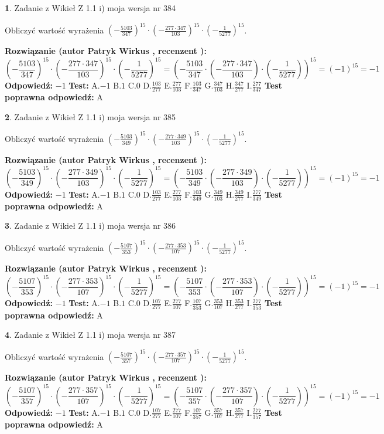 \documentclass[12pt, a4paper]{article}
\theoremstyle{definition} %
\newtheorem{zad}{}
\newcommand{\zadStart}[1]{\begin{zad}#1\newline}
\newcommand{\zadStop}{\end{zad}}
\newcommand{\rozwStart}[2]{\noindent \textbf{Rozwiązanie (autor #1 , recenzent #2): }\newline}
\newcommand{\rozwStop}{\newline}
\newcommand{\odpStart}{\noindent \textbf{Odpowiedź:}\newline}
\newcommand{\odpStop}{\newline}
\newcommand{\testStart}{\noindent \textbf{Test:}\newline}
\newcommand{\testStop}{\newline}
\newcommand{\kluczStart}{\noindent \textbf{Test poprawna odpowiedź:}\newline}
\newcommand{\kluczStop}{\newline}
\begin{document}
\zadStart{Zadanie z Wikieł Z 1.1 i) moja wersja nr 384}

Obliczyć wartość wyrażenia $(-\frac{5103}{347})^{15} \cdot (-\frac{277 \cdot 347}{103})^{15} \cdot (-\frac{1}{5277})^{15}$.
\zadStop
\rozwStart{Patryk Wirkus}{}
$$(-\frac{5103}{347})^{15} \cdot (-\frac{277 \cdot 347}{103})^{15} \cdot (-\frac{1}{5277})^{15} = (-\frac{5103}{347} \cdot (-\frac{277 \cdot 347}{103}) \cdot (-\frac{1}{5277}))^{15} = (-1)^{15} = -1$$
\rozwStop
\odpStart
$-1$
\odpStop
\testStart
A.$-1$ B.$1$ C.$0$ D.$\frac{103}{277}$ E.$\frac{277}{103}$
F.$\frac{103}{347}$ G.$\frac{347}{103}$
H.$\frac{347}{277}$
I.$\frac{277}{347}$
\testStop
\kluczStart
A
\kluczStop



\zadStart{Zadanie z Wikieł Z 1.1 i) moja wersja nr 385}

Obliczyć wartość wyrażenia $(-\frac{5103}{349})^{15} \cdot (-\frac{277 \cdot 349}{103})^{15} \cdot (-\frac{1}{5277})^{15}$.
\zadStop
\rozwStart{Patryk Wirkus}{}
$$(-\frac{5103}{349})^{15} \cdot (-\frac{277 \cdot 349}{103})^{15} \cdot (-\frac{1}{5277})^{15} = (-\frac{5103}{349} \cdot (-\frac{277 \cdot 349}{103}) \cdot (-\frac{1}{5277}))^{15} = (-1)^{15} = -1$$
\rozwStop
\odpStart
$-1$
\odpStop
\testStart
A.$-1$ B.$1$ C.$0$ D.$\frac{103}{277}$ E.$\frac{277}{103}$
F.$\frac{103}{349}$ G.$\frac{349}{103}$
H.$\frac{349}{277}$
I.$\frac{277}{349}$
\testStop
\kluczStart
A
\kluczStop



\zadStart{Zadanie z Wikieł Z 1.1 i) moja wersja nr 386}

Obliczyć wartość wyrażenia $(-\frac{5107}{353})^{15} \cdot (-\frac{277 \cdot 353}{107})^{15} \cdot (-\frac{1}{5277})^{15}$.
\zadStop
\rozwStart{Patryk Wirkus}{}
$$(-\frac{5107}{353})^{15} \cdot (-\frac{277 \cdot 353}{107})^{15} \cdot (-\frac{1}{5277})^{15} = (-\frac{5107}{353} \cdot (-\frac{277 \cdot 353}{107}) \cdot (-\frac{1}{5277}))^{15} = (-1)^{15} = -1$$
\rozwStop
\odpStart
$-1$
\odpStop
\testStart
A.$-1$ B.$1$ C.$0$ D.$\frac{107}{277}$ E.$\frac{277}{107}$
F.$\frac{107}{353}$ G.$\frac{353}{107}$
H.$\frac{353}{277}$
I.$\frac{277}{353}$
\testStop
\kluczStart
A
\kluczStop



\zadStart{Zadanie z Wikieł Z 1.1 i) moja wersja nr 387}

Obliczyć wartość wyrażenia $(-\frac{5107}{357})^{15} \cdot (-\frac{277 \cdot 357}{107})^{15} \cdot (-\frac{1}{5277})^{15}$.
\zadStop
\rozwStart{Patryk Wirkus}{}
$$(-\frac{5107}{357})^{15} \cdot (-\frac{277 \cdot 357}{107})^{15} \cdot (-\frac{1}{5277})^{15} = (-\frac{5107}{357} \cdot (-\frac{277 \cdot 357}{107}) \cdot (-\frac{1}{5277}))^{15} = (-1)^{15} = -1$$
\rozwStop
\odpStart
$-1$
\odpStop
\testStart
A.$-1$ B.$1$ C.$0$ D.$\frac{107}{277}$ E.$\frac{277}{107}$
F.$\frac{107}{357}$ G.$\frac{357}{107}$
H.$\frac{357}{277}$
I.$\frac{277}{357}$
\testStop
\kluczStart
A
\kluczStop
\end{document}
